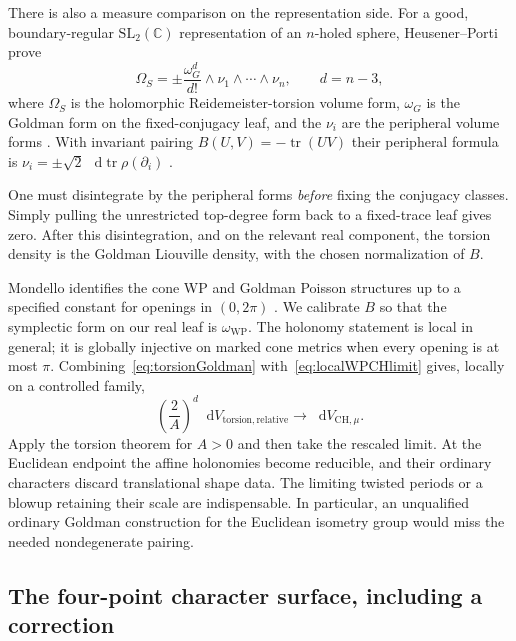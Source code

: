 \documentclass[11pt,a4paper]{article}
\numberwithin{equation}{section}
\theoremstyle{definition}
\theoremstyle{remark}
\DeclareMathOperator{\tr}{tr}
\newcommand{\dd}{\mathop{}\!\mathrm d}
\newcommand{\WP}{\mathrm{WP}}
\newcommand{\CC}{\mathbb C}
\begin{document}
There is also a measure comparison on the representation side.
For a good, boundary-regular $\mathrm{SL}_2(\CC)$ representation
of an $n$-holed sphere, Heusener--Porti prove
\begin{equation}
 \Omega_S=\pm\frac{\omega_G^d}{d!}
                  \wedge\nu_1\wedge\cdots\wedge\nu_n,
                  \qquad d=n-3,
 \label{eq:torsionGoldman}
\end{equation}
where $\Omega_S$ is the holomorphic Reidemeister-torsion volume
form, $\omega_G$ is the Goldman form on the fixed-conjugacy
leaf, and the $\nu_i$ are the peripheral volume forms
\cite[Theorem~3]{HeusenerPorti}. With invariant pairing
$B(U,V)=-\tr(UV)$ their peripheral formula is
$\nu_i=\pm\sqrt2\,\dd\tr\rho(\partial_i)$
\cite[Proposition~2]{HeusenerPorti}.

One must disintegrate by the peripheral forms \emph{before}
fixing the conjugacy classes. Simply pulling the unrestricted
top-degree form back to a fixed-trace leaf gives zero. After
this disintegration, and on the relevant real component, the
torsion density is the Goldman Liouville density, with the
chosen normalization of $B$.

Mondello identifies the cone WP and Goldman Poisson structures
up to a specified constant for openings in $(0,2\pi)$
\cite[Theorems~1.1--1.2]{MondelloCones}. We calibrate $B$ so
that the symplectic form on our real leaf is $\omega_{\WP}$.
The holonomy statement is local in general; it is globally
injective on marked cone metrics when every opening is at
most $\pi$. Combining~\eqref{eq:torsionGoldman}
with~\eqref{eq:localWPCHlimit} gives, locally on a controlled
family,
\begin{equation}
 \boxed{\quad
 \left(\frac2A\right)^d
        \dd V_{\mathrm{torsion,relative}}
    \longrightarrow \dd V_{\mathrm{CH},\mu}.
 \quad}
 \label{eq:torsionDMlimit}
\end{equation}
Apply the torsion theorem for $A>0$ and then take the rescaled
limit. At the Euclidean endpoint the affine holonomies become
reducible, and their ordinary characters discard translational
shape data. The limiting twisted periods or a blowup retaining
their scale are indispensable. In particular, an unqualified
ordinary Goldman construction for the Euclidean isometry group
would miss the needed nondegenerate pairing.

\subsection{The four-point character surface, including a correction}
\end{document}
